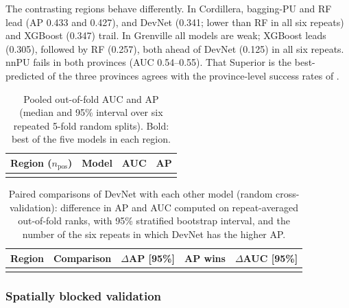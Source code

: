 \documentclass[pdflatex,sn-apa]{sn-jnl}
\begin{document}
The contrasting regions behave differently. In Cordillera, bagging-PU and RF lead (AP 0.433 and 0.427), and DevNet (0.341; lower than RF in all six repeats) and XGBoost (0.347) trail. In Grenville all models are weak; XGBoost leads (0.305), followed by RF (0.257), both ahead of DevNet (0.125) in all six repeats. nnPU fails in both provinces (AUC 0.54--0.55). That Superior is the best-predicted of the three provinces agrees with the province-level success rates of \citet{Parsa2024}.

\begin{table}[t]
\caption{Pooled out-of-fold AUC and AP (median and 95\% interval over six repeated 5-fold random splits). Bold: best of the five models in each region.}\label{tab:benchmark}
\footnotesize
\begin{tabular*}{\textwidth}{@{\extracolsep\fill}llcc}
\toprule
Region ($n_{\mathrm{pos}}$) & Model & AUC & AP \\
\midrule
\botrule
\end{tabular*}
\end{table}

\begin{table}[t]
\caption{Paired comparisons of DevNet with each other model (random cross-validation): difference in AP and AUC computed on repeat-averaged out-of-fold ranks, with 95\% stratified bootstrap interval, and the number of the six repeats in which DevNet has the higher AP.}\label{tab:bootstrap}
\footnotesize
\setlength{\tabcolsep}{3pt}
\begin{tabular*}{\textwidth}{@{\extracolsep\fill}llccc}
\toprule
Region & Comparison & $\Delta$AP [95\%] & AP wins & $\Delta$AUC [95\%] \\
\midrule
\botrule
\end{tabular*}
\end{table}

\subsubsection{Spatially blocked validation}\label{sec:res-spatial}
\end{document}

